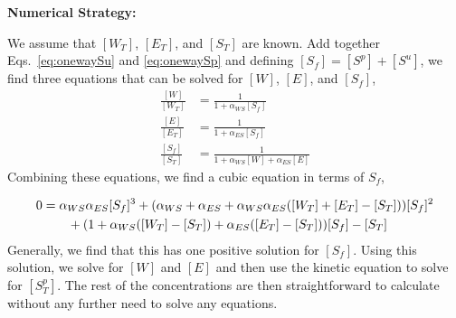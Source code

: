 \documentclass[aps,onecolumn,superscriptaddress,notitlepage]{revtex4-1}
\begin{document}
\textbf{Numerical Strategy:}

We assume that  $[W_T]$, $[E_T]$, and $[S_T]$ are known. 
Add together Eqs.~\eqref{eq:onewaySu} and \eqref{eq:onewaySp} and defining $[S_f] = [S^p]+[S^u]$, 
we find three equations that can be solved for $[W]$, $[E]$, and $[S_f]$,
\begin{align}
\frac{[W]}{[W_T]} & = \frac{1}{1 + \alpha_{WS}[S_f]}\\
\frac{[E]}{[E_T]} & = \frac{1}{1 + \alpha_{ES}[S_f]}\\
\frac{[S_f]}{[S_T]} &= \frac{1}{1 + \alpha_{WS}[W]+ \alpha_{ES}[E]}
\end{align}
Combining these equations, we find a cubic equation in terms of $S_f$,

\begin{align}
0 &= \alpha_{WS}\alpha_{ES}[S_f]^3 +\qty(\alpha_{WS}+\alpha_{ES} + \alpha_{WS}\alpha_{ES}([W_T]+[E_T]- [S_T])) [S_f]^2\\
&\qquad + \qty(1+\alpha_{WS}([W_T]-[S_T]) + \alpha_{ES}([E_T]-[S_T]))[S_f] - [S_T]
\end{align}
Generally, we find that this has one positive solution for $[S_f]$. 
Using this solution, we solve for $[W]$ and $[E]$ and then use the kinetic equation to solve for $[S_T^p]$. The rest of the concentrations are then straightforward to calculate without any further need to solve any equations.



%
%
%
%
%
%
\end{document}
